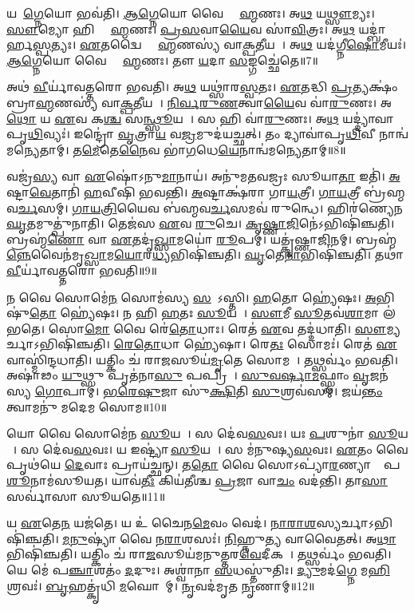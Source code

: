 𑌯𑌦𑌾᳚\ul{𑌗𑍍𑌨𑍇}𑌯𑍋 𑌭𑌵॑𑌤𑌿।
\ul{𑌆}\ul{𑌗𑍍𑌨𑍇}𑌯𑍋 𑌵𑍈 𑌬𑍍𑌰𑌾᳚\ul{𑌹𑍍𑌮}𑌣𑌃।
𑌅\ul{𑌥} 𑌯\ul{𑌥𑍍𑌸𑍗}𑌮𑍍𑌯𑌃।
\ul{𑌸𑍗}𑌮𑍍𑌯𑍋 𑌹𑌿 𑌬𑍍𑌰𑌾᳚\ul{𑌹𑍍𑌮}𑌣𑌃।
\ul{𑌪𑍍𑌰}\ul{𑌸}𑌵𑌾\ul{𑌯𑍈}𑌵 𑌸𑌾॑\ul{𑌵𑌿}𑌤𑍍𑌰𑌃।
𑌅\ul{𑌥} 𑌯𑌦𑍍𑌬𑌾॑𑌰𑍍\mbox{}𑌹\ul{𑌸𑍍𑌪}𑌤𑍍𑌯𑌃।
\ul{𑌏}𑌤𑌦𑍍𑌵𑍈 𑌬𑍍𑌰𑌾᳚\ul{𑌹𑍍𑌮}𑌣𑌸𑍍𑌯॑ 𑌵𑌾\ul{𑌕𑍍𑌪}𑌤𑍀𑌯𑌮𑍍᳚।
𑌅\ul{𑌥} 𑌯𑌦॑𑌗𑍍𑌨𑍀\ul{𑌷𑍋}𑌮𑍀𑌯𑌃॑।
\ul{𑌆}\ul{𑌗𑍍𑌨𑍇}𑌯𑍋 𑌵𑍈 𑌬𑍍𑌰𑌾᳚\ul{𑌹𑍍𑌮}𑌣𑌃।
𑌤𑍗 \ul{𑌯}𑌦𑌾 \ul{𑌸}𑌙𑍍𑌗𑌚𑍍𑌛𑍇॑𑌤𑍇॥7॥

𑌅𑌥॑ \ul{𑌵𑍀}𑌰𑍍𑌯𑌾॑𑌵𑌤𑍍𑌤𑌰𑍋 𑌭𑌵𑌤𑌿।
𑌅\ul{𑌥} 𑌯𑌥𑍍𑌸𑌾॑𑌰\ul{𑌸𑍍𑌵}𑌤𑌃।
\ul{𑌏}𑌤𑌦𑍍𑌧𑌿 \ul{𑌪𑍍𑌰}𑌤𑍍𑌯𑌕𑍍𑌷𑌂॑ 𑌬𑍍𑌰𑌾\ul{𑌹𑍍𑌮}𑌣𑌸𑍍𑌯॑ 𑌵𑌾\ul{𑌕𑍍𑌪}𑌤𑍀𑌯𑌮𑍍᳚।
\ul{𑌨𑌿}\ul{𑌰𑍍𑌵}\ul{𑌰𑍁}\ul{𑌣}𑌤𑍍𑌵𑌾\ul{𑌯𑍈}𑌵 𑌵𑌾॑\ul{𑌰𑍁}𑌣𑌃।
𑌅\ul{𑌥𑍋} 𑌯 \ul{𑌏}𑌵 𑌕\ul{𑌶𑍍𑌚} 𑌸\ul{𑌨𑍍𑌥𑍍𑌸𑍂}𑌯𑌤𑍇᳚।
𑌸 𑌹𑌿 𑌵𑌾॑\ul{𑌰𑍁}𑌣𑌃।
𑌅\ul{𑌥} 𑌯𑌦𑍍𑌦𑍍𑌯𑌾॑𑌵𑌾𑌪𑍃\ul{𑌥𑌿}𑌵𑍍𑌯𑌃॑।
𑌇𑌨𑍍𑌦𑍍𑌰𑍋॑ \ul{𑌵𑍃}𑌤𑍍𑌰𑌾\ul{𑌯} 𑌵\ul{𑌜𑍍𑌰}𑌮𑍁𑌦॑𑌯𑌚𑍍𑌛𑌤𑍍।
𑌤𑌂 𑌦𑍍𑌯𑌾𑌵𑌾॑𑌪𑍃\ul{𑌥𑌿}𑌵𑍀 𑌨𑌾𑌨𑍍𑌵॑𑌮𑌨𑍍𑌯𑍇𑌤𑌾𑌮𑍍।
𑌤\ul{𑌮𑍇}𑌤𑍇\ul{𑌨𑍈}𑌵 𑌭𑌾॑\ul{𑌗}𑌧𑍇\ul{𑌯𑍇}𑌨𑌾𑌨𑍍𑌵॑𑌮𑌨𑍍𑌯𑍇𑌤𑌾𑌮𑍍॥8॥

𑌵𑌜𑍍𑌰॑\ul{𑌸𑍍𑌯} 𑌵𑌾 \ul{𑌏}𑌷𑍋॑\-𑌽𑌨𑍁\ul{𑌮𑌾}𑌨𑌾𑌯॑।
𑌅𑌨𑍁॑𑌮𑌤𑌵𑌜𑍍𑌰𑌃 𑌸𑍂𑌯𑌾\ul{𑌤𑌾} 𑌇𑌤𑌿॑।
\ul{𑌅}𑌷𑍍𑌟𑌾\ul{𑌵𑍇}𑌤𑌾𑌨𑌿॑ \ul{𑌹}𑌵𑍀𑌷𑌿॑ 𑌭𑌵𑌨𑍍𑌤𑌿।
\ul{𑌅}𑌷𑍍𑌟𑌾𑌕𑍍𑌷॑𑌰𑌾 𑌗𑌾\ul{𑌯}𑌤𑍍𑌰𑍀।
\ul{𑌗𑌾}\ul{𑌯}𑌤𑍍𑌰𑍀 𑌬𑍍𑌰॑𑌹𑍍𑌮𑌵\ul{𑌰𑍍𑌚}𑌸𑌮𑍍।
\ul{𑌗𑌾}\ul{𑌯}\ul{𑌤𑍍𑌰𑌿}𑌯𑍈𑌵 𑌬॑𑌹𑍍𑌮𑌵\ul{𑌰𑍍𑌚}𑌸𑌮𑌵॑ 𑌰𑍁𑌨𑍍𑌧𑍇।
𑌹𑌿𑌰॑𑌣𑍍𑌯𑍇𑌨 \ul{𑌘𑍃}𑌤𑌮𑍁𑌤𑍍𑌪𑍁॑𑌨𑌾𑌤𑌿।
𑌤𑍇𑌜॑𑌸 \ul{𑌏}𑌵 \ul{𑌰𑍁}𑌚𑍇।
\ul{𑌕𑍃}\ul{𑌷𑍍𑌣𑌾}\ul{𑌜𑌿}𑌨𑍇॑\-𑌽𑌭𑌿𑌷𑌿॑𑌞𑍍𑌚𑌤𑌿।
𑌬𑍍𑌰𑌹𑍍𑌮॑\ul{𑌣𑍋} 𑌵𑌾 \ul{𑌏}𑌤𑌦𑍃॑\ul{𑌖𑍍𑌸𑌾}𑌮𑌯𑍋॑ \ul{𑌰𑍂}𑌪𑌮𑍍।
𑌯𑌤𑍍𑌕𑍃॑𑌷𑍍𑌣𑌾\ul{𑌜𑌿}𑌨𑌮𑍍।
𑌬𑍍𑌰𑌹𑍍𑌮॑\ul{𑌨𑍍𑌨𑍇}𑌵𑍈𑌨॑𑌮𑍃\ul{𑌖𑍍𑌸𑌾}𑌮\ul{𑌯𑍋}𑌰\ul{𑌧𑍍𑌯}𑌭𑌿𑌷𑌿॑𑌞𑍍𑌚𑌤𑌿।
\ul{𑌘𑍃}𑌤𑍇\ul{𑌨𑌾}𑌭𑌿𑌷𑌿॑𑌞𑍍𑌚𑌤𑌿।
𑌤𑌥𑌾॑ \ul{𑌵𑍀}𑌰𑍍𑌯𑌾॑𑌵𑌤𑍍𑌤𑌰𑍋 𑌭𑌵𑌤𑌿॥9॥\anuvakamend[\ul{𑌸}𑌙𑍍𑌗𑌚𑍍𑌛𑍇॑𑌤𑍇 𑌭𑌾\ul{𑌗}𑌧𑍇\ul{𑌯𑍇}𑌨𑌾𑌨𑍍𑌵॑𑌮𑌨𑍍𑌯𑍇𑌤𑌾\dng{ꣳ} \ul{𑌰𑍂}𑌪𑌂 \ul{𑌚}𑌤𑍍𑌵𑌾𑌰𑌿॑ 𑌚]

𑌨 𑌵𑍈 𑌸𑍋𑌮𑍇॑\ul{𑌨} 𑌸𑍋𑌮॑𑌸𑍍𑌯 \ul{𑌸}𑌵𑍋᳚\-𑌽𑌸𑍍𑌤𑌿।
\ul{𑌹}𑌤𑍋 𑌹𑍍𑌯𑍇॑𑌷𑌃।
\ul{𑌅}𑌭𑌿𑌷𑍁॑\ul{𑌤𑍋} 𑌹𑍍𑌯𑍇॑𑌷𑌃।
𑌨 𑌹𑌿 \ul{𑌹}𑌤𑌃 \ul{𑌸𑍂}𑌯𑌤𑍇᳚।
\ul{𑌸𑍗}𑌮𑍀 \ul{𑌸𑍂}𑌤𑌵॑\ul{𑌶𑌾}𑌮𑌾 𑌲॑𑌭𑌤𑍇।
𑌸𑍋\ul{𑌮𑍋} 𑌵𑍈 𑌰𑍇॑\ul{𑌤𑍋}𑌧𑌾𑌃।
𑌰𑍇𑌤॑ \ul{𑌏}𑌵 𑌤𑌦𑍍𑌦॑𑌧𑌾𑌤𑌿।
\ul{𑌸𑍗}𑌮𑍍𑌯𑌰𑍍𑌚𑌾\-𑌽𑌭𑌿𑌷𑌿॑𑌞𑍍𑌚𑌤𑌿।
\ul{𑌰𑍇}\ul{𑌤𑍋}𑌧𑌾 𑌹𑍍𑌯𑍇॑𑌷𑌾।
𑌰𑍇\ul{𑌤𑌃} 𑌸𑍋𑌮𑌃॑।
𑌰𑍇𑌤॑ \ul{𑌏}𑌵𑌾𑌸𑍍𑌮𑌿॑𑌨𑍍𑌦𑌧𑌾𑌤𑌿।
𑌯𑌤𑍍𑌕𑌿𑌂 𑌚॑ 𑌰𑌾\ul{𑌜}𑌸𑍂𑌯॑\ul{𑌮𑍃}𑌤𑍇 𑌸𑍋𑌮𑌮𑍍᳚।
𑌤𑌥𑍍𑌸𑌰𑍍𑌵𑌂॑ 𑌭𑌵𑌤𑌿।
𑌅𑌷𑌾॑𑌢𑌂 \ul{𑌯𑍁}𑌥𑍍𑌸𑍁 𑌪𑍃𑌤॑𑌨𑌾\ul{𑌸𑍁} 𑌪𑌪𑍍𑌰𑌿𑌮𑍍᳚।
\ul{𑌸𑍁}\ul{𑌵}\ul{𑌰𑍍}𑌷𑌾\ul{𑌮}𑌫𑍍𑌸𑍍𑌵𑌾𑌂 \ul{𑌵𑍃}𑌜𑌨॑𑌸𑍍𑌯 \ul{𑌗𑍋}𑌪𑌾𑌮𑍍।
\ul{𑌭}\ul{𑌰𑍇}\ul{𑌷𑍁}𑌜𑌾 𑌸𑍁॑\ul{𑌕𑍍𑌷𑌿}𑌤𑌿 \ul{𑌸𑍁}𑌶𑍍𑌰𑌵॑𑌸𑌮𑍍।
𑌜𑌯॑\ul{𑌨𑍍𑌤𑌂} 𑌤𑍍𑌵𑌾𑌮𑌨𑍁॑ 𑌮𑌦𑍇𑌮 𑌸𑍋𑌮॥10॥\anuvakamend[𑌰𑍇\ul{𑌤𑌃} 𑌸𑍋𑌮𑌃॑ \ul{𑌸}𑌪𑍍𑌤 𑌚॑]

𑌯𑍋 𑌵𑍈 𑌸𑍋𑌮𑍇॑𑌨 \ul{𑌸𑍂}𑌯𑌤𑍇᳚।
𑌸 𑌦𑍇॑𑌵\ul{𑌸}𑌵𑌃।
𑌯𑌃 \ul{𑌪}𑌶𑍁𑌨𑌾॑ \ul{𑌸𑍂}𑌯𑌤𑍇᳚।
𑌸 𑌦𑍇॑𑌵\ul{𑌸}𑌵𑌃।
𑌯 𑌇𑌷𑍍𑌟𑍍𑌯𑌾॑ \ul{𑌸𑍂}𑌯𑌤𑍇᳚।
𑌸 𑌮॑𑌨𑍁𑌷𑍍𑌯\ul{𑌸}𑌵𑌃।
\ul{𑌏}𑌤𑌂 𑌵𑍈 𑌪𑍃𑌥॑𑌯𑍇 \ul{𑌦𑍇}𑌵𑌾𑌃 𑌪𑍍𑌰𑌾𑌯॑𑌚𑍍𑌛𑌨𑍍।
𑌤\ul{𑌤𑍋} 𑌵𑍈 𑌸𑍋𑌽𑌪𑍍𑌯𑌾॑\ul{𑌰}𑌣𑍍𑌯𑌾𑌨𑌾𑌂᳚ 𑌪\ul{𑌶𑍂}𑌨𑌾𑌮॑𑌸𑍂𑌯𑌤।
𑌯𑌾𑌵॑\ul{𑌤𑍀𑌃} 𑌕𑌿𑌯॑𑌤𑍀𑌶𑍍𑌚 \ul{𑌪𑍍𑌰}𑌜𑌾 𑌵𑌾\ul{𑌚𑌂} 𑌵𑌦॑𑌨𑍍𑌤𑌿।
𑌤𑌾\ul{𑌸𑌾}\ul{} 𑌸𑌰𑍍𑌵𑌾॑𑌸𑌾 𑌸𑍂𑌯𑌤𑍇॥11॥

𑌯 \ul{𑌏}𑌤𑍇\ul{𑌨} 𑌯𑌜॑𑌤𑍇।
𑌯 𑌉॑ 𑌚𑍈𑌨\ul{𑌮𑍇}𑌵𑌂 𑌵𑍇𑌦॑।
\ul{𑌨𑌾}\ul{𑌰𑌾}\ul{𑌶}\ul{}𑌸𑍍𑌯𑌰𑍍𑌚𑌾\-𑌽𑌭𑌿𑌷𑌿॑𑌞𑍍𑌚𑌤𑌿।
\ul{𑌮}\ul{𑌨𑍁}𑌷𑍍𑌯𑌾॑ 𑌵𑍈 𑌨\ul{𑌰𑌾}𑌶𑌸𑌃॑।
\ul{𑌨𑌿}𑌹𑍍𑌨𑍁\ul{𑌤𑍍𑌯} 𑌵𑌾𑌵𑍈𑌤𑌤𑍍।
𑌅\ul{𑌥𑌾}𑌭𑌿𑌷𑌿॑𑌞𑍍𑌚𑌤𑌿।
𑌯𑌤𑍍𑌕𑌿𑌂 𑌚॑ 𑌰𑌾\ul{𑌜}𑌸𑍂𑌯॑𑌮𑌨𑍁𑌤𑍍𑌤𑌰\ul{𑌵𑍇}𑌦𑍀𑌕𑌮𑍍᳚।
𑌤𑌥𑍍𑌸𑌰𑍍𑌵𑌂॑ 𑌭𑌵𑌤𑌿।
𑌯𑍇 𑌮𑍇॑ 𑌪\ul{𑌞𑍍𑌚𑌾}𑌶𑌤𑌂॑ \ul{𑌦}𑌦𑍁𑌃।
𑌅𑌶𑍍𑌵𑌾॑𑌨𑌾 \ul{𑌸}𑌧𑌸𑍍𑌤𑍁॑𑌤𑌿𑌃।
\ul{𑌦𑍍𑌯𑍁}𑌮𑌦॑\ul{𑌗𑍍𑌨𑍇} 𑌮\ul{𑌹𑌿} 𑌶𑍍𑌰𑌵𑌃॑।
\ul{𑌬𑍃}𑌹𑌤𑍍𑌕𑍃॑𑌧𑌿 \ul{𑌮}𑌘𑍋𑌨𑌾᳚𑌮𑍍।
\ul{𑌨𑍃}𑌵𑌦॑𑌮𑍃𑌤 \ul{𑌨𑍃}𑌣𑌾𑌮𑍍॥12॥\anuvakamend[\ul{𑌸𑍂}\ul{𑌯}\ul{𑌤𑍇} \ul{𑌸}𑌧𑌸𑍍𑌤𑍁॑\ul{𑌤𑌿}𑌸𑍍𑌤𑍍𑌰𑍀𑌣𑌿॑ 𑌚]

